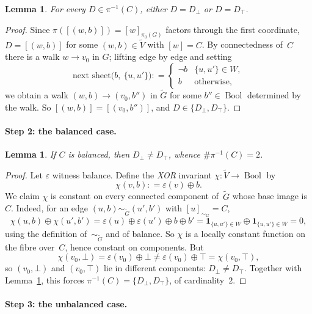\documentclass[11pt,a4paper]{amsart}
\theoremstyle{plain}
\newtheorem{lemma}[theorem]{Lemma}
\theoremstyle{definition}
\theoremstyle{remark}
\newcommand{\tG}{\widetilde{G}}
\newcommand{\tV}{\widetilde{V}}
\newcommand{\comp}{\pi_0}
\newcommand{\defeq}{\mathrel{\mathop:}=}
\begin{document}
\begin{lemma}\label{lem:fiber-subset}
For every $D\in\pi^{-1}(C)$, either $D=D_\bot$ or $D=D_\top$.
\end{lemma}

\begin{proof}
Since $\pi([(w,b)]) = [w]_{\comp(G)}$ factors through the first
coordinate, $D=[(w,b)]$ for some $(w,b)\in\tV$ with $[w]=C$. By
connectedness of~$C$ there is a walk $w\to v_0$ in $G$; lifting
edge by edge and setting
\[
  \text{next sheet}\bigl(b,\ \{u,u'\}\bigr)
  \defeq \begin{cases} \neg b & \{u,u'\}\in W,\\
    b & \text{otherwise,} \end{cases}
\]
we obtain a walk $(w,b)\to (v_0,b'')$ in $\tG$ for some
$b''\in\operatorname{Bool}$ determined by the walk. So
$[(w,b)]=[(v_0,b'')]$, and $D\in\{D_\bot,D_\top\}$.
\end{proof}

\paragraph{Step 2: the balanced case.}

\begin{lemma}\label{lem:sep-if-balanced}
If $C$ is balanced, then $D_\bot\ne D_\top$, whence
$\#\pi^{-1}(C)=2$.
\end{lemma}

\begin{proof}
Let $\varepsilon$ witness balance. Define the \emph{XOR}
invariant $\chi:\tV\to \operatorname{Bool}$ by
\[
  \chi(v,b) \defeq \varepsilon(v)\oplus b.
\]
We claim $\chi$ is constant on every connected component
of~$\tG$ whose base image is~$C$. Indeed, for an edge
$(u,b)\sim_{\tG}(u',b')$ with $[u]_{\sim_G}=C$,
\[
  \chi(u,b)\oplus \chi(u',b')
    = \varepsilon(u)\oplus \varepsilon(u')\oplus b\oplus b'
    = \mathbf{1}_{\{u,u'\}\in W} \oplus \mathbf{1}_{\{u,u'\}\in W}
    = 0,
\]
using the definition of~$\sim_{\tG}$ and of balance. So $\chi$
is a locally constant function on the fibre over~$C$, hence
constant on components. But
\[
  \chi(v_0,\bot) = \varepsilon(v_0)\oplus \bot \ne
  \varepsilon(v_0)\oplus \top = \chi(v_0,\top),
\]
so $(v_0,\bot)$ and $(v_0,\top)$ lie in different components:
$D_\bot\ne D_\top$. Together with Lemma~\ref{lem:fiber-subset},
this forces $\pi^{-1}(C) = \{D_\bot,D_\top\}$, of cardinality~$2$.
\end{proof}

\paragraph{Step 3: the unbalanced case.}
\end{document}
